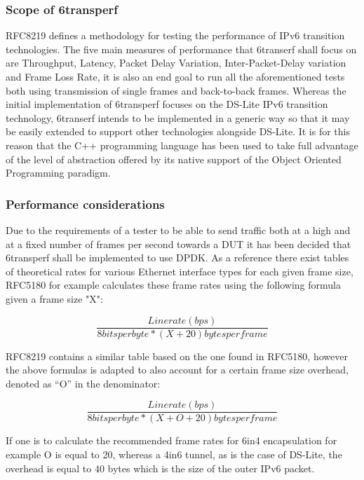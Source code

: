 \documentclass[a4paper,12p,titlepage]{article}
\begin{document}
\subsubsection{Scope of 6transperf}
RFC8219 defines a methodology for testing the performance of IPv6 transition technologies. The five main measures of performance that 6transerf shall focus on are Throughput, Latency, Packet Delay Variation, Inter-Packet-Delay variation and Frame Loss Rate, it is also an end goal to run all the aforementioned tests both using transmission of single frames and back-to-back frames.
Whereas the initial implementation of 6transperf focuses on the DS-Lite IPv6 transition technology, 6transerf intends to be implemented in a generic way so that it may be easily extended to support other technologies alongside DS-Lite. It is for this reason that the C++ programming language has been used to take full advantage of the level of abstraction offered by its native support of the Object Oriented Programming paradigm.
\subsubsection{Performance considerations}
Due to the requirements of a tester to be able to send traffic both at a high and at a fixed number of frames per second towards a DUT it has been decided that 6transperf shall be implemented to use DPDK. As a reference there exist tables of theoretical rates for various Ethernet interface types for each given frame size, RFC5180 for example calculates these frame rates using the following formula given a frame size "X":

\begin{equation}
\frac{Line rate (bps)}{8 bits per byte*(X+20) bytes per frame}
\end{equation}

RFC8219 contains a similar table based on the one found in RFC5180, however the above formulas is adapted to also account for a certain frame size overhead, denoted as “O” in the denominator:

\begin{equation}
\frac{Line rate (bps)}{8 bits per byte*(X+O+20) bytes per frame}
\end{equation}

If one is to calculate the recommended frame rates for 6in4 encapsulation for example O is equal to 20, whereas a 4in6 tunnel, as is the case of DS-Lite, the overhead is equal to 40 bytes which is the size of the outer IPv6 packet.
\end{document}

